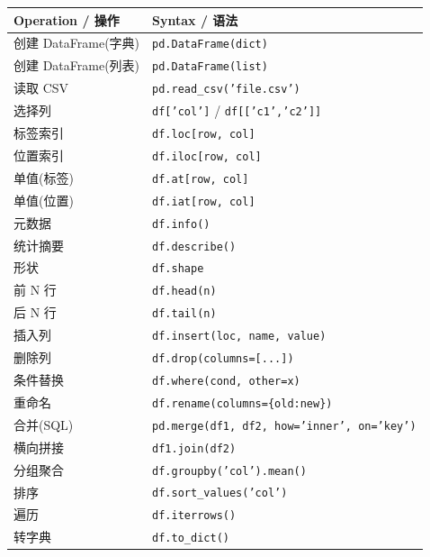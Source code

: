 \documentclass[11pt,a4paper]{article}
\begin{document}
\begin{table}[h]
\centering
\small
\renewcommand{\arraystretch}{1.3}
\begin{tabular}{@{}ll@{}}
\toprule
\textbf{Operation / 操作} & \textbf{Syntax / 语法} \\ \midrule
创建 DataFrame(字典) & \texttt{pd.DataFrame(dict)} \\
创建 DataFrame(列表) & \texttt{pd.DataFrame(list)} \\
读取 CSV & \texttt{pd.read\_csv('file.csv')} \\
选择列 & \texttt{df['col']} / \texttt{df[['c1','c2']]} \\
标签索引 & \texttt{df.loc[row, col]} \\
位置索引 & \texttt{df.iloc[row, col]} \\
单值(标签) & \texttt{df.at[row, col]} \\
单值(位置) & \texttt{df.iat[row, col]} \\
元数据 & \texttt{df.info()} \\
统计摘要 & \texttt{df.describe()} \\
形状 & \texttt{df.shape} \\
前 N 行 & \texttt{df.head(n)} \\
后 N 行 & \texttt{df.tail(n)} \\
插入列 & \texttt{df.insert(loc, name, value)} \\
删除列 & \texttt{df.drop(columns=[...])} \\
条件替换 & \texttt{df.where(cond, other=x)} \\
重命名 & \texttt{df.rename(columns=\{old:new\})} \\
合并(SQL) & \texttt{pd.merge(df1, df2, how='inner', on='key')} \\
横向拼接 & \texttt{df1.join(df2)} \\
分组聚合 & \texttt{df.groupby('col').mean()} \\
排序 & \texttt{df.sort\_values('col')} \\
遍历 & \texttt{df.iterrows()} \\
转字典 & \texttt{df.to\_dict()} \\ \bottomrule
\end{tabular}
\end{table}
\end{document}
